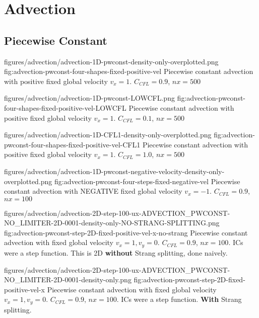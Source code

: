 \section{Advection}



\subsection{Piecewise Constant}




\quickfigcap
	{figures/advection/advection-1D-pwconst-density-only-overplotted.png}
	{fig:advection-pwconst-four-shapes-fixed-positive-vel}
	{
		Piecewise constant advection with positive fixed global velocity $v_x = 1$. $C_{CFL} = 0.9$,  $nx = 500$
	}

\quickfigcap
	{figures/advection/advection-1D-pwconst-LOWCFL.png}
	{fig:advection-pwconst-four-shapes-fixed-positive-vel-LOWCFL}
	{
		Piecewise constant advection with positive fixed global velocity $v_x = 1$. 
		$C_{CFL} = 0.1$,  $nx = 500$
	}



\quickfigcap
	{figures/advection/advection-1D-CFL1-density-only-overplotted.png}
	{fig:advection-pwconst-four-shapes-fixed-positive-vel-CFL1}
	{
		Piecewise constant advection with positive fixed global velocity $v_x = 1$. 
		$C_{CFL} = 1.0$, $nx = 500$
	}


\quickfigcap
	{figures/advection/advection-1D-pwconst-negative-velocity-density-only-overplotted.png}
	{fig:advection-pwconst-four-steps-fixed-negative-vel}
	{
		Piecewise constant advection with NEGATIVE fixed global velocity $v_x = -1$. 
		$C_{CFL} = 0.9$, $nx = 100$
	}









\quickfigcap
	{figures/advection/advection-2D-step-100-ux-ADVECTION_PWCONST-NO_LIMITER-2D-0001-density-only-NO-STRANG-SPLITTING.png}
	{fig:advection-pwconst-step-2D-fixed-positive-vel-x-no-strang}
	{
		Piecewise constant advection with fixed global velocity $v_x = 1, v_y = 0$. $C_{CFL} = 0.9$, $nx = 100$. 
		ICs were a step function.
		This is 2D \textbf{without} Strang splitting, done naively.
	}
	

\quickfigcap
	{figures/advection/advection-2D-step-100-ux-ADVECTION_PWCONST-NO_LIMITER-2D-0001-density-only.png}
	{fig:advection-pwconst-step-2D-fixed-positive-vel-x}
	{
		Piecewise constant advection with fixed global velocity $v_x = 1, v_y = 0$. $C_{CFL} = 0.9$, $nx = 100$. 
		ICs were a step function.
		\textbf{With} Strang splitting.
	}





